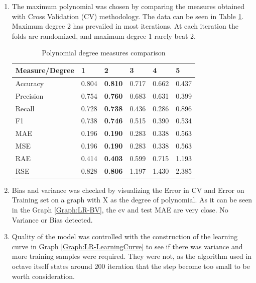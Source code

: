 \documentclass{article}
\begin{document}
\begin{enumerate}  
\item The maximum polynomial was chosen by comparing the measures obtained with Cross Validation (CV) methodology. The data can be seen in Table
\ref{tab:LR-Measures}. Maximum degree 2 has prevailed in most iterations. At each iteration the folds are randomized, and maximum degree 1 rarely beat 2.

\begin{table}[]
\centering
\caption{Polynomial degree measures comparison}
\label{tab:LR-Measures}
\begin{tabular}{|l|l|l|l|l|l|}
\hline
Measure/Degree  & 1     & \textbf{2}     & 3     & 4     & 5     \\ \hline
Accuracy  		& 0.804 & \textbf{0.810} & 0.717 & 0.662 & 0.437 \\ \hline
Precision		& 0.754 & \textbf{0.760} & 0.683 & 0.631 & 0.399 \\ \hline
Recall    		& 0.728 & \textbf{0.738} & 0.436 & 0.286 & 0.896 \\ \hline
F1        		& 0.738 & \textbf{0.746} & 0.515 & 0.390 & 0.534 \\ \hline
MAE       		& 0.196 & \textbf{0.190} & 0.283 & 0.338 & 0.563 \\ \hline
MSE       		& 0.196 & \textbf{0.190} & 0.283 & 0.338 & 0.563 \\ \hline
RAE       		& 0.414 & \textbf{0.403} & 0.599 & 0.715 & 1.193 \\ \hline
RSE       		& 0.828 & \textbf{0.806} & 1.197 & 1.430 & 2.385 \\ \hline
\end{tabular}
\end{table}

\item Bias and variance was checked by visualizing the Error in CV and Error on Training set on a graph with X as the degree of polynomial. As it can be seen in the Graph \ref{Graph:LR-BV}, the cv and test MAE are very close. No Variance or Bias detected. 


\item Quality of the model was controlled with the construction of the learning curve in Graph \ref{Graph:LR-LearningCurve} to see if there was variance and more training samples were required. They were not, as the algorithm used in octave itself states around 200 iteration that the step become too small to be worth consideration.
\end{enumerate}
\end{document}
